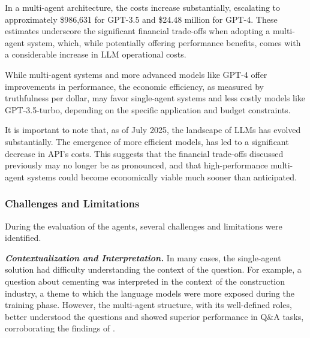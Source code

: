                 In a multi-agent architecture, the costs increase substantially, escalating to approximately \$986,631 for GPT-3.5 and \$24.48 million for GPT-4. These estimates underscore the significant financial trade-offs when adopting a multi-agent system, which, while potentially offering performance benefits, comes with a considerable increase in LLM operational costs.

                While multi-agent systems and more advanced models like GPT-4 offer improvements in performance, the economic efficiency, as measured by truthfulness per dollar, may favor single-agent systems and less costly models like GPT-3.5-turbo, depending on the specific application and budget constraints.

                It is important to note that, as of July 2025, the landscape of LLMs has evolved substantially. The emergence of more efficient models, has led to a significant decrease in API's costs. This suggests that the financial trade-offs discussed previously may no longer be as pronounced, and that high-performance multi-agent systems could become economically viable much sooner than anticipated.

                
            
            \subsubsection{Challenges and Limitations}     
                During the evaluation of the agents, several challenges and limitations were identified.

                \textbf{\textit{Contextualization and Interpretation.}} 
                    In many cases, the single-agent solution had difficulty understanding the context of the question. For example, a question about cementing was interpreted in the context of the construction industry, a theme to which the language models were more exposed during the training phase. 
                    However, the multi-agent structure, with its well-defined roles, better understood the questions and showed superior performance in Q\&A tasks, corroborating the findings of \citep{Li2024}.
                
